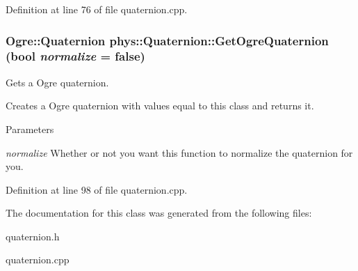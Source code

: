 Definition at line 76 of file quaternion.cpp.

\hypertarget{classphys_1_1Quaternion_ad7501687205092c203d2358ca53d3bfe}{
\subsubsection[{GetOgreQuaternion}]{\setlength{\rightskip}{0pt plus 5cm}Ogre::Quaternion phys::Quaternion::GetOgreQuaternion (bool {\em normalize} = {\ttfamily false})}}
\label{df/d8c/classphys_1_1Quaternion_ad7501687205092c203d2358ca53d3bfe}


Gets a Ogre quaternion. 

Creates a Ogre quaternion with values equal to this class and returns it. 
\begin{DoxyParams}{Parameters}
\item[{\em normalize}]Whether or not you want this function to normalize the quaternion for you. \end{DoxyParams}


Definition at line 98 of file quaternion.cpp.



The documentation for this class was generated from the following files:\begin{DoxyCompactItemize}
\item 
quaternion.h\item 
quaternion.cpp\end{DoxyCompactItemize}
